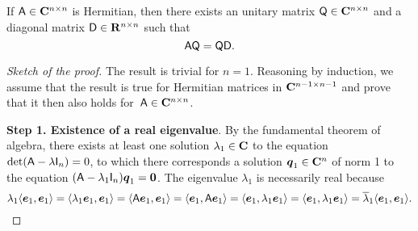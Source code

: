 \begin{theorem}
    \label{theorem:spectral_theorem}
    If $\mathsf A \in \mathbf C^{n \times n}$ is Hermitian,
    then there exists an unitary matrix $\mathsf Q \in \mathbf C^{n \times n}$ and a diagonal matrix $\mathsf D \in \mathbf R^{n \times n}$ such that
    \[
        \mathsf A \mathsf Q = \mathsf Q \mathsf D.
    \]
\end{theorem}
\begin{proof}
    [Sketch of the proof]
    The result is trivial for $n = 1$.
    Reasoning by induction,
    we assume that the result is true for Hermitian matrices in $\mathbf C^{n-1 \times n-1}$
    and prove that it then also holds for~$\mathsf A \in \mathbf C^{n \times n}$.

            \vspace{.3cm}
            \textbf{Step 1. Existence of a real eigenvalue}.
            By the fundamental theorem of algebra,
            there exists at least one solution $\lambda_1 \in \mathbf C$ to the equation $\det(\mathsf A - \lambda \mathsf I_n) = 0$,
            to which there corresponds a solution $\mathbf{\boldsymbol{q}}_1 \in \mathbf C^n$ of norm 1 to the equation $(\mathsf A - \lambda_1 \mathsf I_n) \mathbf{\boldsymbol{q}}_{1} = \mathbf{\boldsymbol{0}}$.
            The eigenvalue $\lambda_1$ is necessarily real because
            \[
                \lambda_1 \langle\mathbf{\boldsymbol{e}}_1, \mathbf{\boldsymbol{e}}_1\rangle
                = \langle\lambda_1 \mathbf{\boldsymbol{e}}_1, \mathbf{\boldsymbol{e}}_1\rangle
                = \langle\mathsf A \mathbf{\boldsymbol{e}}_1, \mathbf{\boldsymbol{e}}_1\rangle
                = \langle\mathbf{\boldsymbol{e}}_1, \mathsf A\mathbf{\boldsymbol{e}}_1\rangle
                = \langle\mathbf{\boldsymbol{e}}_1, \lambda_1 \mathbf{\boldsymbol{e}}_1\rangle
                = \langle\mathbf{\boldsymbol{e}}_1, \lambda_1 \mathbf{\boldsymbol{e}}_1\rangle
                = \overline \lambda_1 \langle\mathbf{\boldsymbol{e}}_1, \mathbf{\boldsymbol{e}}_1\rangle.
            \]


\end{proof}
